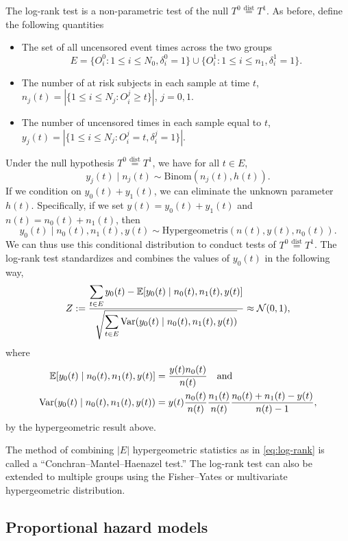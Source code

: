 The log-rank test is a non-parametric test of the null $T^0 \stackrel{\text{dist}}{=} T^1$. As before, define the following quantities 

\begin{itemize}
    \item The set of all uncensored event times across the two groups \[
        E = \{O_i^0 : 1 \le i \le N_0, \delta_i^0=1\} \cup \{O_i^1 : 1 \le i \le n_1, \delta_i^1=1\}.
        \]
    \item The number of at risk subjects in each sample at time $t$, $n_j(t) = |\{1 \le i \le N_j : O_i^j \ge t\}|$, $j=0,1$.
    \item The number of uncensored times in each sample equal to $t$, $y_j(t) = |\{1 \le i \le N_j : O_i^j =t, \delta_i^j=1\}|$. 
\end{itemize}
Under the null hypothesis $T^0  \stackrel{\text{dist}}{=} T^1$, we have for all $t \in E$, 
\[y_j(t) \mid n_j(t) \sim \mathrm{Binom}(n_j(t), h(t)). \]
If we condition on $y_0(t)+y_1(t)$, we can eliminate the unknown parameter $h(t)$. Specifically, if we set $y(t)=y_0(t)+y_1(t)$ and $n(t)=n_0(t)+n_1(t)$, then
\[y_0(t)\mid n_0(t),n_1(t), y(t) \sim \mathrm{Hypergeometris}(n(t), y(t), n_0(t)). \]
We can thus use this conditional distribution to conduct tests of $T^0 \stackrel{\text{dist}}{=} T^1$.  The log-rank test standardizes and combines the values of $y_0(t)$ in the following way,
\begin{equation}\label{eq:log-rank}
    Z := \frac{\displaystyle{\sum_{t \in E} y_0(t) - {\mathbb E}[y_0(t) \mid n_0(t),n_1(t),y(t)]}}{\displaystyle{\sqrt{\sum_{t \in E} \mathrm{Var}(y_0(t)\mid n_0(t), n_1(t), y(t))}}} \approx {\mathcal N}(0,1),
\end{equation}
where 
\begin{align*}
    {\mathbb E}[y_0(t) \mid n_0(t),n_1(t), y(t)] &= \frac{y(t)n_0(t)}{n(t)} \quad \text{and }\\
    \mathrm{Var}(y_0(t)\mid n_0(t), n_1(t), y(t)) &= y(t)\frac{n_0(t)}{n(t)}\frac{n_1(t)}{n(t)}\frac{n_0(t)+n_1(t)-y(t)}{n(t)-1},\\
\end{align*} 
by the hypergeometric result above. 

The method of combining $|E|$ hypergeometric statistics as in \eqref{eq:log-rank} is called a ``Conchran--Mantel--Haenazel test.'' The log-rank test can also be extended to multiple groups using the Fisher--Yates or multivariate hypergeometric distribution.

\subsection{Proportional hazard models}

